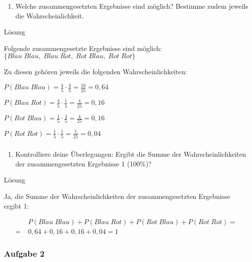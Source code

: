 \documentclass[
  ngerman,
]{book}
\providecommand{\tightlist}{%
  \setlength{\itemsep}{0pt}\setlength{\parskip}{0pt}}
\begin{document}
\begin{enumerate}
\def\labelenumi{\alph{enumi})}
\setcounter{enumi}{1}
\tightlist
\item
  Welche zusammengesetzten Ergebnisse sind möglich? Bestimme zudem jeweils die Wahrscheinlichkeit.
\end{enumerate}

Lösung

Folgende zusammengesetzte Ergebnisse sind möglich: \(\{Blau\;Blau,\; Blau\;Rot,\; Rot\;Blau,\; Rot\;Rot\}\)

Zu diesen gehören jeweils die folgenden Wahrscheinlichkeiten:

\(P(Blau\;Blau)= \frac{4}{5}\cdot\frac{4}{5}=\frac{16}{25}= 0,64\)

\(P(Blau\;Rot)= \frac{4}{5}\cdot\frac{1}{5}=\frac{4}{25}=0,16\)

\(P(Rot\;Blau)= \frac{1}{5}\cdot\frac{4}{5}=\frac{4}{25}=0,16\)

\(P(Rot\;Rot)= \frac{1}{5}\cdot\frac{1}{5}=\frac{1}{25}= 0,04\)

\hypertarget{section-113}{%
\subsubsection*{}\label{section-113}}

\begin{enumerate}
\def\labelenumi{\alph{enumi})}
\setcounter{enumi}{2}
\tightlist
\item
  Kontrolliere deine Überlegungen: Ergibt die Summe der Wahrscheinlichkeiten der zusammengesetzten Ergebnisse 1 (100\%)?
\end{enumerate}

Lösung

Ja, die Summe der Wahrscheinlichkeiten der zusammengesetzten Ergebnisse ergibt 1:

\[\begin{align} &P(Blau\;Blau) + P(Blau\;Rot) + P(Rot\;Blau)+ P(Rot\;Rot) = \\
=\; &0,64 + 0,16 + 0,16 + 0,04 = 1\end{align}\]

\hypertarget{section-114}{%
\subsubsection*{}\label{section-114}}

\hypertarget{aufgabe-2-12}{%
\subsubsection*{Aufgabe 2}\label{aufgabe-2-12}}
\end{document}
